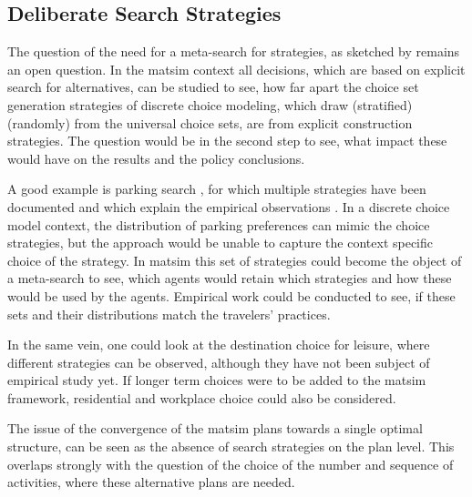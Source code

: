 \subsection{Deliberate Search Strategies}
\label{sec:delib-search-strat}

The question of the need for a meta-search for strategies, as sketched by \citet[][]{ArthurBar} remains an open question. 
In the \gls{matsim} context all decisions, which are based on explicit search for alternatives, can be studied to see, how far apart the choice set generation strategies of discrete choice modeling, which draw (stratified) (randomly) from the universal choice sets, are from explicit construction strategies. 
The question would be in the second step to see, what impact these would have on the results and the policy conclusions. 

A good example is parking search \citep[][]{Waraich_unpub_IATBR_2012}, for which multiple strategies have been documented and which explain the empirical observations \citep[][]{Shoup_2005}. 
In a discrete choice model context, the distribution of parking preferences can mimic the choice strategies, but the approach would be unable to capture the context specific choice of the strategy. 
In \gls{matsim} this set of strategies could become the object of a meta-search to see, which agents would retain which strategies and how these would be used by the agents. 
Empirical work could be conducted to see, if these sets and their distributions match the travelers' practices. 

In the same vein, one could look at the destination choice for leisure, where different strategies can be observed, although they have not been subject of empirical study yet. 
If longer term choices were to be added to the \gls{matsim} framework, residential and workplace choice could also be considered. 

The issue of the convergence of the \gls{matsim} plans towards a single optimal structure, can be seen as the absence of search strategies on the plan level. 
This overlaps strongly with the question of the choice of the number and sequence of activities, where these alternative plans are needed. 


